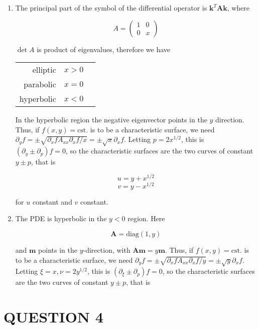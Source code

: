 \documentclass[a4paper]{article}
\begin{document}
\begin{enumerate}
	\item The principal part of the symbol of the differential operator is $ \mathbf{k}^{T} \mathbf{A} \mathbf{k} $, where 

	\[ A = \begin{pmatrix}
	1 & 0 \\
	0 & x
	\end{pmatrix} \]
	
	$ \det A  $ is product of eigenvalues, therefore we have 
	
	\begin{center}
		\begin{tabular}{rll}
			elliptic  & $ x > 0  $ \\
			parabolic  &  $ x = 0 $  \\
			hyperbolic &  $ x < 0$ 
		\end{tabular}
	\end{center}

	In the hyperbolic region the negative eigenvector points in the $ y $ direction. Thus, if $ f(x,y) = \text{cst.} $ is to be a characteristic surface, we need $ \partial_{y} f = \pm \sqrt{ \partial_{x} f  A_{xx} \partial_{x} f / x } = \pm \sqrt{x} \partial_{x} f  $. Letting $ p = 2 x^{1/2} $, this is $ (\partial_{y} \pm \partial_{p})f = 0 $, so the characteristic surfaces are the two curves of constant $ y \pm p $, that is
	
	\[ u = y + x^{1/2} \]
	\[ v = y - x^{1/2} \]
	
	for $ u $ constant and $ v $ constant.

	\item The PDE is hyperbolic in the $ y < 0 $ region. Here
	
	\[ \mathbf{A} = \text{diag}(1,y) \]
	
	and $ \mathbf{m} $ points in the $ y $-direction, with $ \mathbf{A} \mathbf{m} = y \mathbf{m} $. Thus, if $ f(x,y) = \text{cst.} $ is to be a characteristic surface, we need $ \partial_{y} f = \pm \sqrt{ \partial_{x} f  A_{xx} \partial_{x} f / y } = \pm \sqrt{y} \partial_{x} f  $. Letting $ \xi = x, \nu  = 2 y^{1/2} $, this is $ (\partial_{\xi} \pm \partial_{p})f = 0 $, so the characteristic surfaces are the two curves of constant $ y \pm p $, that is
	
	 
	
\end{enumerate}



\section{QUESTION 4}
\end{document}
